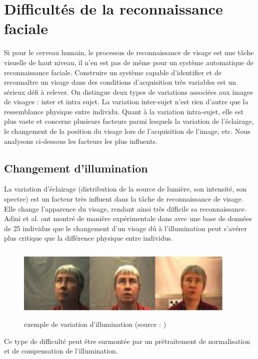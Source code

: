 \section{Difficultés de la reconnaissance faciale}
 Si pour le cerveau humain, le processus de reconnaissance de visage est une tâche visuelle de haut niveau, il n'en est pas de même pour un système automatique de reconnaissance faciale. Construire un système capable d'identifier et de reconnaître un visage dans des conditions d'acquisition très variables est un sérieux défi à relever. On distingue deux types de variations associées aux images de visages : inter et intra sujet. La variation inter-sujet n'est rien d'autre que la ressemblance physique entre individu. Quant à la variation intra-sujet, elle est plus vaste et concerne plusieurs facteurs parmi lesquels la variation de l'éclairage, le changement de la position du visage lors de l'acquisition de l'image, etc. Nous analysons ci-dessous les facteurs les plus influents.

\subsection{Changement d'illumination }

La variation d'éclairage (distribution de la source de lumière, son intensité, son spectre) est un facteur très influent dans la tâche de reconnaissance de visage. Elle change l'apparence du visage, rendant ainsi très difficile sa reconnaissance. Adini et al. ont montré de manière expérimentale dans \citep{Adi} avec une base de données de 25 individus que le changement d'un visage dû à l'illumination peut s'avérer plus critique que la différence physique entre individus. 
\begin{figure}[htbp]
	\centering
		\includegraphics[height=100pt, width=300pt]{illumination.JPG}
	\caption[exemple de variation d'illumination]{exemple de variation d'illumination (source : \cite{Sou12})}
	\label{fig:illumination}
\end{figure}
Ce type de difficulté peut être surmontée par un prétraitement de normalisation et de compensation de l'illumination.
